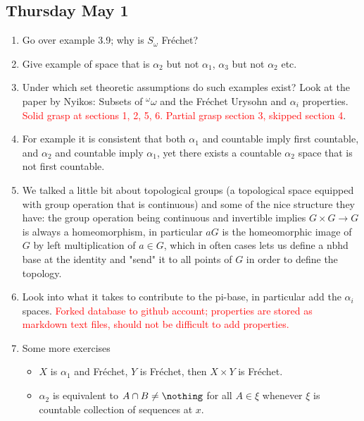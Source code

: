 \documentclass{article}
\begin{document}
\subsection*{Thursday May 1}
\begin{enumerate}
    \item Go over example 3.9; why is \(S_{\omega}\) Fréchet? \checkmark
    \item Give example of space that is \(\alpha_2\) but not \(\alpha_1\), \(\alpha_3\) but not \(\alpha_2\) etc. 
    \item Under which set theoretic assumptions do such examples exist? Look at the paper by Nyikos: Subsets of \(^\omega \omega\) and the Fréchet Urysohn and \(\alpha_i\) properties. \textcolor{red}{Solid grasp at sections 1, 2, 5, 6. Partial grasp section 3, skipped section 4}.
    
    \item For example it is consistent that both \(\alpha_1\) and countable imply first countable, and \(\alpha_2\) and countable imply  \(\alpha_1\), yet there exists a countable \(\alpha_2\) space that is not first countable.

    \item We talked a little bit about topological groups (a topological space equipped with group operation that is continuous) and some of the nice structure they have: the group operation being continuous and invertible implies \(G\times G \to G\) is always a homeomorphism, in particular \(aG\) is the homeomorphic image of \(G\) by left multiplication of \(a \in G\), which in often cases lets us define a nbhd base at the identity and "send" it to all points of \(G\) in order to define the topology.
    \item Look into what it takes to contribute to the pi-base, in particular add the \(\alpha_i\) spaces.
    \textcolor{red}{Forked database to github account; properties are stored as markdown text files, should not be difficult to add properties.}
    \item Some more exercises 
    \begin{itemize}
        \item \(X\) is \(\alpha_1\) and Fréchet, \(Y\) is Fréchet, then \(X \times Y\) is Fréchet.
        \item \(\alpha_2\) is equivalent to \(A \cap B \neq \nothing\) for all \(A \in \xi\) whenever \(\xi\) is countable collection of sequences at \(x\). \checkmark
    \end{itemize}
\end{enumerate}
\end{document}
